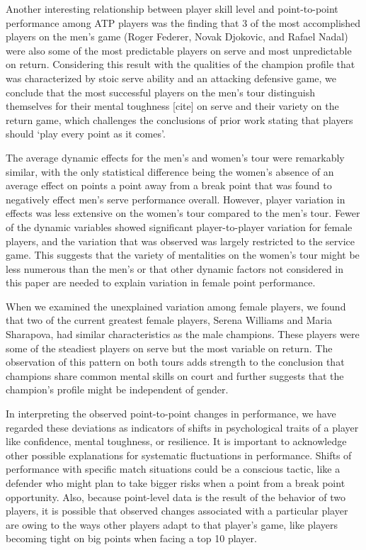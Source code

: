 \documentclass{Latex/svjour3}
\begin{document}
Another interesting relationship between player skill level and
point-to-point performance among ATP players was the finding that 3 of
the most accomplished players on the men's game (Roger Federer, Novak
Djokovic, and Rafael Nadal) were also some of the most predictable
players on serve and most unpredictable on return. Considering this
result with the qualities of the champion profile that was
characterized by stoic serve ability and an attacking defensive game,
we conclude that the most successful players on the men's tour distinguish themselves for their
mental toughness [cite] on serve and their variety on the return
game, which challenges the conclusions of prior work stating that
players should `play every point as it comes'\cite{klaassen2001points}.

The average dynamic effects for the men's and women's tour were
remarkably similar, with the only statistical difference being the
women's absence of an average effect on points a point away from a
break point that was found to negatively effect men's serve
performance overall. However, player variation in effects was less extensive on the women's
tour compared to the men's tour. Fewer of the dynamic variables showed
significant player-to-player variation for female players, and the
variation that was observed was largely restricted to the service
game. This suggests that the variety of mentalities on the women's
tour might be less numerous than the men's or that other dynamic
factors not considered in this paper are needed to explain variation
in female point performance. 

When we examined the unexplained variation among female players, we
found that two of the current greatest female players, Serena Williams
and Maria Sharapova, had similar characteristics as the male
champions. These players were some of the steadiest players on serve
but the most variable on return. The observation of this pattern on
both tours adds strength to the conclusion that champions share common
mental skills on court and further suggests that the champion's
profile might be independent of gender.

In interpreting the observed point-to-point changes in performance, we
have regarded these deviations as indicators of shifts in psychological traits of
a player like confidence, mental toughness, or resilience. It is
important to acknowledge other possible explanations for systematic fluctuations in
performance. Shifts of performance with specific match situations could be a
conscious tactic, like a defender who might plan to take bigger risks
when a point from a break point opportunity. Also, because point-level
data is the result of the behavior of two players, it is possible that
observed changes associated with a particular player are owing to the
ways other players adapt to that player's game, like players becoming
tight on big points when facing a top 10 player. 
\end{document}
